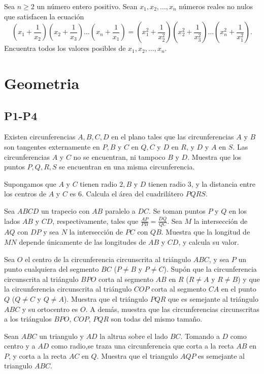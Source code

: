 \documentclass[11pt]{scrartcl}
\begin{document}
\begin{problem}
[2020/6] 
    Sea $n\ge 2$ un número entero positivo. Sean $x_1, x_2, \dots, x_n$ números reales no nulos que satisfacen la ecuación
\[\left(x_1+\frac{1}{x_2}\right)\left(x_2+\frac{1}{x_3}\right)\dots\left(x_n+\frac{1}{x_1}\right)=\left(x_1^2+\frac{1}{x_2^2}\right)\left(x_2^2+\frac{1}{x_3^2}\right)\dots\left(x_n^2+\frac{1}{x_1^2}\right). \]
Encuentra todos los valores posibles de $x_1, x_2, \dots, x_n$.
\end{problem}


\section{Geometria}
\subsection{P1-P4}
\begin{problem} [2000/1]

    Existen circunferencias $A,B,C,D$ en el plano tales que las circunferencias $A$ y $B$ son tangentes externamente en $P, B$ y $C$ en $Q, C$ y $D$ en $R$, y $D$ y $A$ en $S$. Las circunferencias $A$ y $C$ no se encuentran, ni tampoco $B$ y $D$.
Muestra que los puntos $P,Q,R,S$ se encuentran en una misma circunferencia.

Supongamos que $A$ y $C$ tienen radio $2, B$ y $D$ tienen radio $3$, y la distancia entre los centros de $A$ y $C$ es $6$. Calcula el área del cuadrilátero $PQRS$.

   
\end{problem}
\begin{problem}[2003/4] 
    Sea $ABCD$ un trapecio con $AB$ paralelo a $DC$. Se toman puntos $P$ y $Q$ en los lados $AB$ y $CD$, respectivamente, tales que $\frac{AP}{PB}=\frac{DQ}{QC}$. Sea $M$ la intersección de $AQ$ con $DP$ y sea $N$ la intersección de $PC$ con $QB$. Muestra que la longitud de $MN$ depende únicamente de las longitudes de $AB$ y $CD$, y calcula su valor.
   \end{problem}
\begin{problem} [2005/1] 
    Sea $O$ el centro de la circunferencia circunscrita al triángulo $ABC$, y sea $P$ un punto cualquiera del segmento $BC$ ($P\neq B$ y $P\neq C$). Supón que la circunferencia circunscrita al triángulo $BPO$ corta al segmento $AB$ en $R$ ($R\neq A$ y $R\neq B$) y que la circunferencia circunscrita al triángulo $COP$ corta al segmento $CA$ en el punto $Q$ ($Q\neq C$ y $Q\neq A$). Muestra que el triángulo $PQR$ que es semejante al triángulo $ABC$ y su ortocentro es $O$. A demás, muestra que las circunferencias circunscritas a los triángulos $BPO$, $COP$, $PQR$ son todas del mismo tamaño.
    \end{problem}
\begin{problem}
[2009/1] Sean $ABC$ un triangulo y $AD$ la altrua sobre el lado $BC$. Tomando a $D$ como centro y a $AD$ como radio,se traza una circunferencia que corta a la recta $AB$ en $P$, y corta a la recta $AC$ en $Q$. Muestra que el triangulo $AQP$ es semejante al triangulo $ABC$.
\end{problem}
\end{document}
